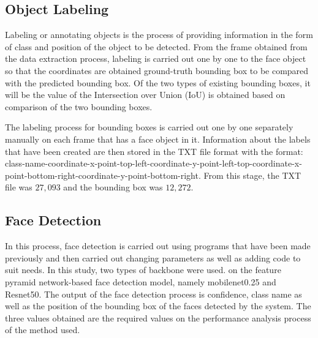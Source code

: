 




\subsection{Object Labeling}
\label{subsec:pelabelanwajah}

Labeling or annotating objects is the process of providing information
in the form of class and position of the object to be detected.
From the frame obtained from the data extraction process, labeling is carried out
one by one to the face object so that the coordinates are obtained
ground-truth bounding box to be compared with the predicted bounding box.
Of the two types of existing bounding boxes, it will be
the value of the Intersection over Union (IoU) is obtained based on
comparison of the two bounding boxes.

The labeling process for bounding boxes is carried out one by one separately
manually on each frame that has a face object in it.
Information about the labels that have been created are then stored in the
TXT file format with the format: class-name-coordinate-x-point-top-left-coordinate-y-point-left-top-coordinate-x-point-bottom-right-coordinate-y-point-bottom-right.
From this stage, the TXT file was $27,093$ and the bounding box was $12,272$.

\subsection{Face Detection}
\label{subsec:pendeteksianwajah}

In this process, face detection is carried out using
programs that have been made previously and then carried out
changing parameters as well as adding code to suit
needs. In this study, two types of backbone were used.
on the feature pyramid network-based face detection model, namely mobilenet0.25
and Resnet50.
The output of the face detection process is confidence, class name
as well as the position of the bounding box of the faces detected by the system.
The three values obtained are the required values
on the performance analysis process of the method used.

